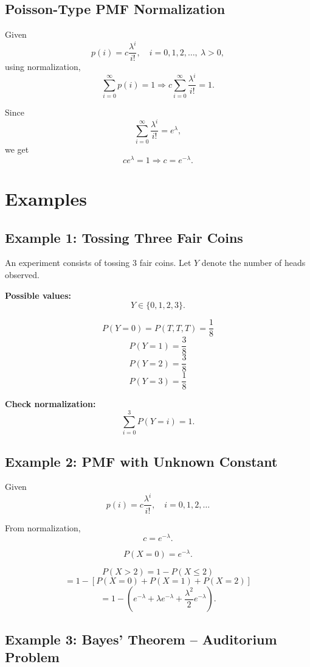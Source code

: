 \documentclass[12pt]{article}
\begin{document}
\subsection*{Poisson-Type PMF Normalization}

Given
\[
p(i) = c \frac{\lambda^i}{i!}, \quad i = 0,1,2,\dots, \ \lambda > 0,
\]
using normalization,
\[
\sum_{i=0}^{\infty} p(i) = 1
\Rightarrow
c \sum_{i=0}^{\infty} \frac{\lambda^i}{i!} = 1.
\]

Since
\[
\sum_{i=0}^{\infty} \frac{\lambda^i}{i!} = e^{\lambda},
\]
we get
\[
c e^{\lambda} = 1
\Rightarrow
c = e^{-\lambda}.
\]

\section*{Examples}

\subsection*{Example 1: Tossing Three Fair Coins}

An experiment consists of tossing 3 fair coins.  
Let $Y$ denote the number of heads observed.

\textbf{Possible values:}
\[
Y \in \{0,1,2,3\}.
\]

\[
P(Y=0) = P(T,T,T) = \frac{1}{8}
\]
\[
P(Y=1) = \frac{3}{8}
\]
\[
P(Y=2) = \frac{3}{8}
\]
\[
P(Y=3) = \frac{1}{8}
\]

\textbf{Check normalization:}
\[
\sum_{i=0}^{3} P(Y=i) = 1.
\]

\subsection*{Example 2: PMF with Unknown Constant}

Given
\[
p(i) = c \frac{\lambda^i}{i!}, \quad i = 0,1,2,\dots
\]

From normalization,
\[
c = e^{-\lambda}.
\]

\[
P(X=0) = e^{-\lambda}.
\]

\[
P(X > 2) = 1 - P(X \leq 2)
\]
\[
= 1 - [P(X=0) + P(X=1) + P(X=2)]
\]
\[
= 1 - \left(e^{-\lambda} + \lambda e^{-\lambda} + \frac{\lambda^2}{2} e^{-\lambda}\right).
\]

\subsection*{Example 3: Bayes' Theorem -- Auditorium Problem}
\end{document}
